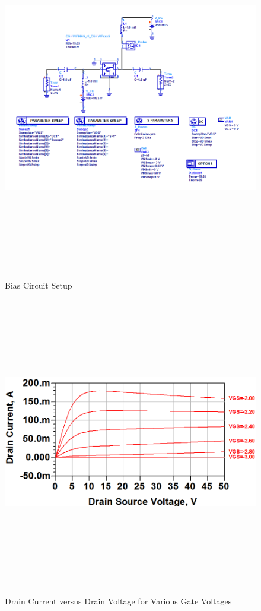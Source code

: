\begin{figure}
  \centering
  \includegraphics[width=6in,height=6in,keepaspectratio]{figures/simulation/bias_ckt}\\
  \caption{Bias Circuit Setup}
  \label{fig:bias_ckt}
\end{figure}

\begin{figure}
  \centering
  \includegraphics[width=5in,height=5in,keepaspectratio]{figures/simulation/ids_versus_vds}\\
  \caption{Drain Current versus Drain Voltage for Various Gate Voltages}
  \label{fig:ids_versus_vds}
\end{figure}


